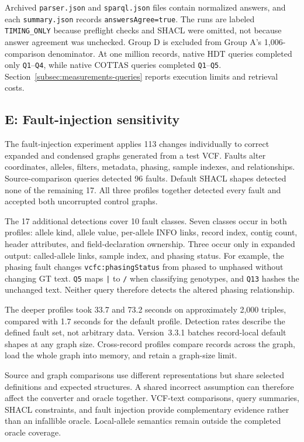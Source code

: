 \documentclass[11pt]{article}
\begin{document}
Archived \texttt{parser.json} and \texttt{sparql.json} files contain normalized answers, and each \texttt{summary.json} records \texttt{answersAgree=true}.
The runs are labeled \texttt{TIMING\_ONLY} because preflight checks and SHACL were omitted, not because answer agreement was unchecked.
Group D is excluded from Group A's 1,006-comparison denominator.
At one million records, native HDT queries completed only \texttt{Q1}--\texttt{Q4}, while native COTTAS queries completed \texttt{Q1}--\texttt{Q5}.
Section~\ref{subsec:measurements-queries} reports execution limits and retrieval costs.

\subsection{E: Fault-injection sensitivity}\label{subsec:validation-sensitivity}
The fault-injection experiment applies 113 changes individually to correct expanded and condensed graphs generated from a test VCF.
Faults alter coordinates, alleles, filters, metadata, phasing, sample indexes, and relationships.
Source-comparison queries detected 96 faults.
Default SHACL shapes detected none of the remaining 17.
All three profiles together detected every fault and accepted both uncorrupted control graphs.

The 17 additional detections cover 10 fault classes.
Seven classes occur in both profiles: allele kind, allele value, per-allele INFO links, record index, contig count, header attributes, and field-declaration ownership.
Three occur only in expanded output: called-allele links, sample index, and phasing status.
For example, the phasing fault changes \texttt{vcfc:phasingStatus} from phased to unphased without changing GT text.
\texttt{Q5} maps \texttt{|} to \texttt{/} when classifying genotypes, and \texttt{Q13} hashes the unchanged text.
Neither query therefore detects the altered phasing relationship.

The deeper profiles took 33.7 and 73.2 seconds on approximately 2,000 triples, compared with 1.7 seconds for the default profile.
Detection rates describe the defined fault set, not arbitrary data.
Version~3.3.1 batches record-local default shapes at any graph size.
Cross-record profiles compare records across the graph, load the whole graph into memory, and retain a graph-size limit.

Source and graph comparisons use different representations but share selected definitions and expected structures.
A shared incorrect assumption can therefore affect the converter and oracle together.
VCF-text comparisons, query summaries, SHACL constraints, and fault injection provide complementary evidence rather than an infallible oracle.
Local-allele semantics remain outside the completed oracle coverage.
\end{document}
